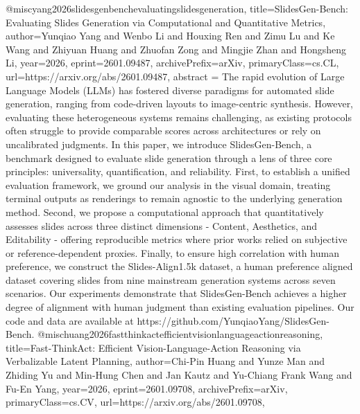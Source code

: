 {}@misc{yang2026slidesgenbenchevaluatingslidesgeneration,
      title={SlidesGen-Bench: Evaluating Slides Generation via Computational and Quantitative Metrics}, 
      author={Yunqiao Yang and Wenbo Li and Houxing Ren and Zimu Lu and Ke Wang and Zhiyuan Huang and Zhuofan Zong and Mingjie Zhan and Hongsheng Li},
      year={2026},
      eprint={2601.09487},
      archivePrefix={arXiv},
      primaryClass={cs.CL},
      url={https://arxiv.org/abs/2601.09487},
      abstract = {The rapid evolution of Large Language Models (LLMs) has fostered diverse paradigms for automated slide generation, ranging from code-driven layouts to image-centric synthesis. However, evaluating these heterogeneous systems remains challenging, as existing protocols often struggle to provide comparable scores across architectures or rely on uncalibrated judgments. In this paper, we introduce SlidesGen-Bench, a benchmark designed to evaluate slide generation through a lens of three core principles: universality, quantification, and reliability. First, to establish a unified evaluation framework, we ground our analysis in the visual domain, treating terminal outputs as renderings to remain agnostic to the underlying generation method. Second, we propose a computational approach that quantitatively assesses slides across three distinct dimensions - Content, Aesthetics, and Editability - offering reproducible metrics where prior works relied on subjective or reference-dependent proxies. Finally, to ensure high correlation with human preference, we construct the Slides-Align1.5k dataset, a human preference aligned dataset covering slides from nine mainstream generation systems across seven scenarios. Our experiments demonstrate that SlidesGen-Bench achieves a higher degree of alignment with human judgment than existing evaluation pipelines. Our code and data are available at https://github.com/YunqiaoYang/SlidesGen-Bench.}
}@misc{huang2026fastthinkactefficientvisionlanguageactionreasoning,
      title={Fast-ThinkAct: Efficient Vision-Language-Action Reasoning via Verbalizable Latent Planning}, 
      author={Chi-Pin Huang and Yunze Man and Zhiding Yu and Min-Hung Chen and Jan Kautz and Yu-Chiang Frank Wang and Fu-En Yang},
      year={2026},
      eprint={2601.09708},
      archivePrefix={arXiv},
      primaryClass={cs.CV},
      url={https://arxiv.org/abs/2601.09708},
}
